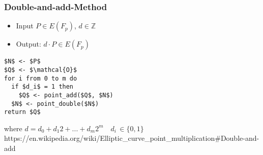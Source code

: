 \begin{frame}[fragile]
\frametitle{Double-and-add-Method}
\begin{itemize}
\item{Input $P \in E(F_p)$, $d \in \mathbb{Z}$}
\item{Output: $d\cdot P \in E(F_p)$}
\end{itemize}
\begin{lstlisting}[frame=single, mathescape=true]
$N$ <- $P$
$Q$ <- $\mathcal{O}$
for i from 0 to m do
  if $d_i$ = 1 then
    $Q$ <- point_add($Q$, $N$)
  $N$ <- point_double($N$)
return $Q$
\end{lstlisting}
where
$d = d_0 + d_1 2 + ... + d_m 2^m \quad d_i \, \in \{0,1\}$
\vfill
\tiny{https://en.wikipedia.org/wiki/Elliptic\_curve\_point\_multiplication\#Double-and-add}
\end{frame}
